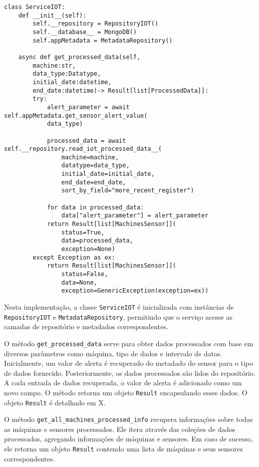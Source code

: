 \begin{verbatim}
class ServiceIOT:
    def __init__(self):
        self.__repository = RepositoryIOT()
        self.__database__ = MongoDB()
        self.appMetadata = MetadataRepository()
            
    async def get_processed_data(self,
        machine:str,
        data_type:Datatype,
        initial_date:datetime,
        end_date:datetime)-> Result[list[ProcessedData]]:
        try:
            alert_parameter = await self.appMetadata.get_sensor_alert_value(
            data_type)

            processed_data = await self.__repository.read_iot_processed_data__(
                machine=machine,
                datatype=data_type,
                initial_date=initial_date,
                end_date=end_date,
                sort_by_field="more_recent_register")
            
            for data in processed_data:
                data["alert_parameter"] = alert_parameter
            return Result[list[MachinesSensor]](
                status=True,
                data=processed_data,
                exception=None)
        except Exception as ex:
            return Result[list[MachinesSensor]](
                status=False,
                data=None,
                exception=GenericException(exception=ex))
\end{verbatim}

Nesta implementação, a classe \texttt{ServiceIOT} é inicializada com instâncias de \texttt{RepositoryIOT} e \texttt{MetadataRepository}, permitindo que o serviço acesse as camadas de repositório e metadados correspondentes.

O método \texttt{get\_processed\_data} serve para obter dados processados com base em diversos parâmetros como máquina, tipo de dados e intervalo de datas. Inicialmente, um valor de alerta é recuperado do metadado do sensor para o tipo de dados fornecido. Posteriormente, os dados processados são lidos do repositório. A cada entrada de dados recuperada, o valor de alerta é adicionado como um novo campo. O método retorna um objeto \texttt{Result} encapsulando esses dados. O objeto \texttt{Result} é detalhado em X. %

O método \texttt{get\_all\_machines\_processed\_info} recupera informações sobre todas as máquinas e sensores processados. Ele itera através das coleções de dados processados, agregando informações de máquinas e sensores. Em caso de sucesso, ele retorna um objeto \texttt{Result} contendo uma lista de máquinas e seus sensores correspondentes.

